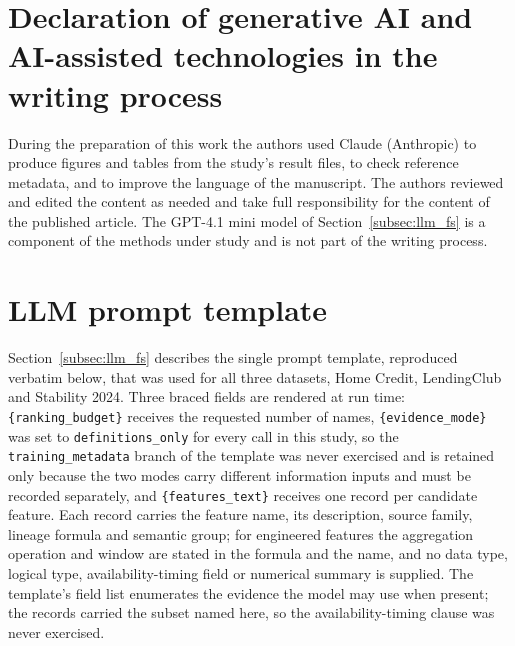 \documentclass[final,5p,twocolumn]{elsarticle}
\begin{document}
\section*{Declaration of generative AI and AI-assisted technologies in the writing process}
During the preparation of this work the authors used Claude (Anthropic) to produce figures and tables from the study's result files, to check reference metadata, and to improve the language of the manuscript. The authors reviewed and edited the content as needed and take full responsibility for the content of the published article. The GPT-4.1 mini model of Section~\ref{subsec:llm_fs} is a component of the methods under study and is not part of the writing process.

\appendix
\section{LLM prompt template}
\label{app:prompts}

Section~\ref{subsec:llm_fs} describes the single prompt template, reproduced verbatim below, that was used for all three datasets, Home Credit, LendingClub and Stability 2024. Three braced fields are rendered at run time: \texttt{\{ranking\_budget\}} receives the requested number of names, \texttt{\{evidence\_mode\}} was set to \texttt{definitions\_only} for every call in this study, so the \texttt{training\_metadata} branch of the template was never exercised and is retained only because the two modes carry different information inputs and must be recorded separately, and \texttt{\{features\_text\}} receives one record per candidate feature. Each record carries the feature name, its description, source family, lineage formula and semantic group; for engineered features the aggregation operation and window are stated in the formula and the name, and no data type, logical type, availability-timing field or numerical summary is supplied. The template's field list enumerates the evidence the model may use when present; the records carried the subset named here, so the availability-timing clause was never exercised.
\end{document}
